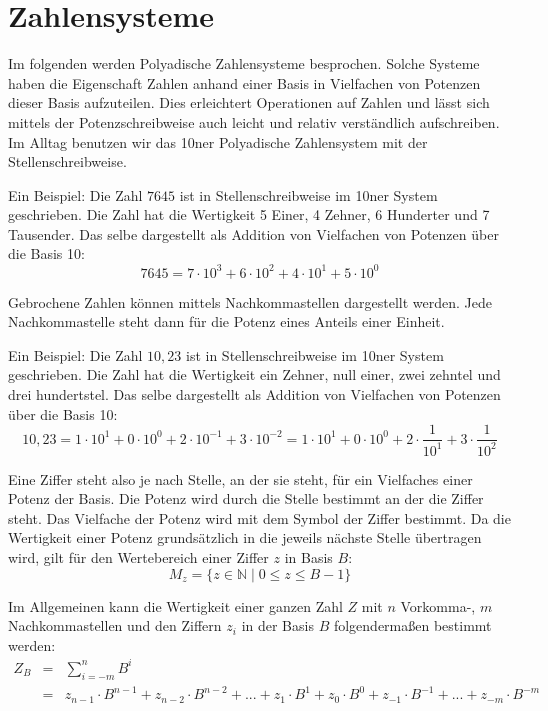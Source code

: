 \documentclass[11pt,a4paper]{scrreprt}
\begin{document}
\chapter{Zahlensysteme}
Im folgenden werden Polyadische Zahlensysteme besprochen. Solche Systeme haben die Eigenschaft Zahlen anhand einer Basis in Vielfachen von Potenzen dieser Basis aufzuteilen. Dies erleichtert Operationen auf Zahlen und lässt sich mittels der Potenzschreibweise auch leicht und relativ verständlich aufschreiben. Im Alltag benutzen wir das 10ner Polyadische Zahlensystem mit der Stellenschreibweise.

Ein Beispiel: Die Zahl $7645$ ist in Stellenschreibweise im 10ner System geschrieben. Die Zahl hat die Wertigkeit 5 Einer, 4 Zehner, 6 Hunderter und 7 Tausender. Das selbe dargestellt als Addition von Vielfachen von Potenzen über die Basis 10:
\[
	7645 = 7 \cdot 10^3 + 6 \cdot 10^2 + 4 \cdot 10^1 + 5 \cdot 10^0
\]

Gebrochene Zahlen können mittels Nachkommastellen dargestellt werden. Jede Nachkommastelle steht dann für die Potenz eines Anteils einer Einheit.

Ein Beispiel: Die Zahl $10,23$ ist in Stellenschreibweise im 10ner System geschrieben. Die Zahl hat die Wertigkeit ein Zehner, null einer, zwei zehntel und drei hundertstel. Das selbe dargestellt als Addition von Vielfachen von Potenzen über die Basis 10:
\[
	10,23 = 1 \cdot 10^1 + 0 \cdot 10^0 + 2 \cdot 10^{-1} + 3 \cdot 10^{-2} 
	= 1 \cdot 10^1 + 0 \cdot 10^0 + 2 \cdot \frac{1}{10^1} + 3 \cdot  \frac{1}{10^2}
\]

Eine Ziffer steht also je nach Stelle, an der sie steht, für ein Vielfaches einer Potenz der Basis. Die Potenz wird durch die Stelle bestimmt an der die Ziffer steht. Das Vielfache der Potenz wird mit dem Symbol der Ziffer bestimmt. Da die Wertigkeit einer Potenz grundsätzlich in die jeweils nächste Stelle übertragen wird, gilt für den Wertebereich einer Ziffer $z$ in Basis $B$:
\[
	M_z = \{ z \in \mathbb{N} \mid 0 \le z \le B - 1 \}
\]

Im Allgemeinen kann die Wertigkeit einer ganzen Zahl $Z$ mit $n$ Vorkomma-, $m$ Nachkommastellen und den Ziffern $z_i$ in der Basis $B$ folgendermaßen bestimmt werden:
\begin{eqnarray*}
	Z_B & = & \sum_{i=-m}^n B^i \\
		& = & z_{n-1} \cdot B^{n-1} + z_{n-2} \cdot B^{n-2} + ... 
		+ z_1 \cdot B^1 + z_0 \cdot B^0 + z_{-1} \cdot B^{-1} 
		+ ... + z_{-m} \cdot B^{-m}
\end{eqnarray*}
\end{document}

